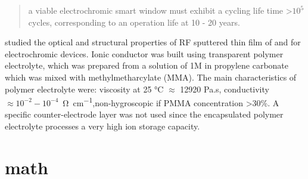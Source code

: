 \documentclass[12pt,oneside]{book}
\begin{document}
\begin{quote}
a viable electrochromic smart window must exhibit a cycling life time \textgreater $10^5$ cycles, corresponding to an operation life at 10 - 20 years.
\end{quote}


\citeauthor{Sella1998} studied the optical and structural properties of RF sputtered thin film of  and  for electrochromic devices. Ionic conductor was built using transparent polymer electrolyte, which was prepared from a solution of 1M  in propylene carbonate which was mixed with methylmetharcylate (MMA). The main characteristics of polymer electrolyte were: viscosity at 25 \si{\degreeCelsius} $\approx$ 12920 Pa.s, conductivity $\approx 10^{-2}-10^{-4}$\si{\per\ohm\per cm},non-hygroscopic if PMMA concentration \textgreater 30\%. A specific counter-electrode layer was not used since the encapsulated polymer electrolyte processes a very high ion storage capacity.\cite{Sella1998}


    \appendix
    \chapter{math}
    \renewcommand{\bibname}{REFERENCES}
    \begin{singlespace}
    \printbibliography
    \end{singlespace}
\end{document}
